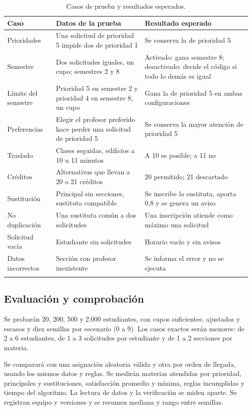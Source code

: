 \begin{table}[htbp]
\caption{Casos de prueba y resultados esperados.}\label{tab:aceptacion}
\small
\begin{tabularx}{\textwidth}{@{}lLL@{}}
\toprule
Caso & Datos de la prueba & Resultado esperado \\
\midrule
Prioridades & Una solicitud de prioridad 5 impide dos de prioridad 1 & Se conserva la de prioridad 5 \\
Semestre & Dos solicitudes iguales, un cupo; semestres 2 y 8 & Activado: gana semestre 8; desactivado: decide el código si todo lo demás es igual \\
Límite del semestre & Prioridad 5 en semestre 2 y prioridad 4 en semestre 8, un cupo & Gana la de prioridad 5 en ambas configuraciones \\
Preferencias & Elegir el profesor preferido hace perder una solicitud de prioridad 5 & Se conserva la mayor atención de prioridad 5 \\
Traslado & Clases seguidas, edificios a 10 u 11 minutos & A 10 es posible; a 11 no \\
Créditos & Alternativas que llevan a 20 o 21 créditos & 20 permitido; 21 descartado \\
Sustitución & Principal sin secciones, sustituta compatible & Se inscribe la sustituta, aporta 0,8 y se genera un aviso \\
No duplicación & Una sustituta común a dos solicitudes & Una inscripción atiende como máximo una solicitud \\
Solicitud vacía & Estudiante sin solicitudes & Horario vacío y sin avisos \\
Datos incorrectos & Sección con profesor inexistente & Se informa el error y no se ejecuta \\
\botrule
\end{tabularx}
\end{table}

\subsection{Evaluación y comprobación}

Se probarán 20, 200, 500 y 2.000 estudiantes, con cupos suficientes, ajustados y escasos y diez semillas por escenario (0 a 9). Los casos exactos serán menores: de 2 a 6 estudiantes, de 1 a 3 solicitudes por estudiante y de 1 a 2 secciones por materia.

Se comparará con una asignación aleatoria válida y otra por orden de llegada, usando los mismos datos y reglas. Se medirán materias atendidas por prioridad, principales y sustituciones, satisfacción promedio y mínima, reglas incumplidas y tiempo del algoritmo. La lectura de datos y la verificación se miden aparte. Se registran equipo y versiones y se resumen mediana y rango entre semillas.

